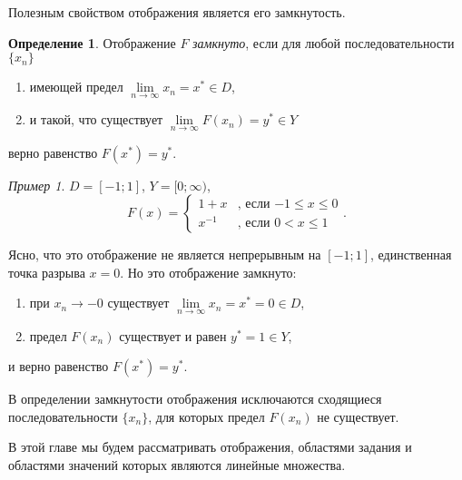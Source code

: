 \documentclass[12pt,a4paper,titlepage,oneside]{book}
\theoremstyle{definition}
\newtheorem*{definition}{Определение}
\theoremstyle{plain}
\theoremstyle{break}
\theoremstyle{remark}
\theoremstyle{remark}
\newtheorem*{example}{Пример}
\theoremstyle{remark}
\theoremstyle{remark}
\theoremstyle{plain}
\theoremstyle{plain}
\begin{document}
Полезным свойством отображения является его замкнутость.

\begin{definition} Отображение $F$ \textit{замкнуто}, если для любой последовательности  $\lbrace x_n \rbrace$

\begin{enumerate}

 \item имеющей предел $\lim \limits_{n \to \infty} x_n= x^* \in D$,
 
 \item и такой, что существует $\lim \limits_{n \to \infty} F(x_n)= y^* \in Y$
 
\end{enumerate} 
 
верно равенство $F(x^*)=y^*$.

\end{definition}

\begin{example}
$D=[-1;1]$, $Y=[0;\infty)$,
\begin{equation*}
F(x) = 
\begin{cases}
   1+x &\text{, если $-1\leqslant x \leqslant 0$}\\
   x^{-1} &\text{, если $0< x \leqslant 1$}
\end{cases}
.
\end{equation*}

Ясно, что это отображение не является непрерывным на $[-1;1]$, единственная точка разрыва $x=0$. Но это отображение замкнуто:

\begin{enumerate}

 \item при $x_n \to -0$ существует $\lim \limits_{n \to \infty} x_n= x^*=0 \in D$,
 
 \item предел $F(x_n)$ существует и равен $y^*=1 \in Y$,
 
\end{enumerate}
и верно равенство $F(x^*)=y^*$.

\end{example}

В определении замкнутости отображения исключаются сходящиеся последовательности $\lbrace x_n \rbrace$, для которых предел $F(x_n)$ не существует.

В этой главе мы будем рассматривать отображения, областями задания и областями значений которых являются линейные множества.
\end{document}
